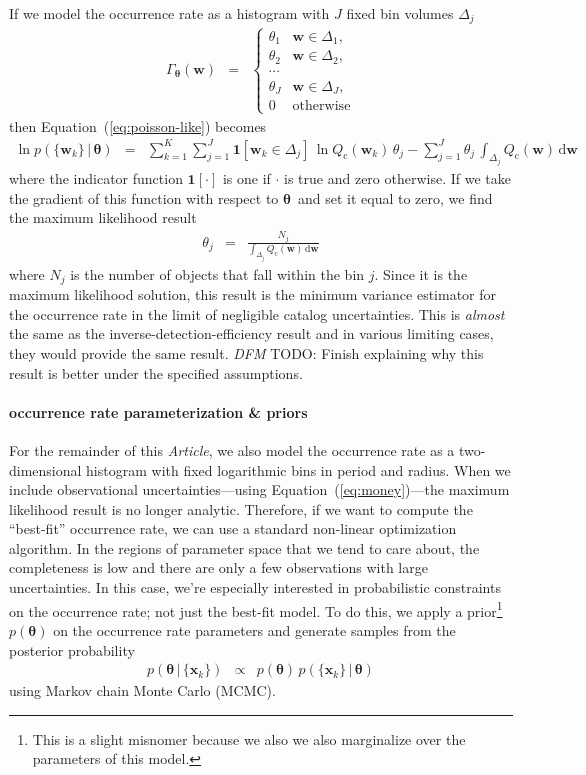 \documentclass[12pt,preprint]{aastex}
\newcommand{\paper}{\textsl{Article}}
\newcommand{\Eq}[1]{Equation~(\ref{eq:#1})}
\newcommand{\eq}[1]{\Eq{#1}}
\newcommand{\eqlabel}[1]{\label{eq:#1}}
\newcommand{\dd}{\ensuremath{\,\mathrm{d}}}
\newcommand{\bvec}[1]{\ensuremath{\boldsymbol{#1}}}
\newcommand{\todo}[3]{{\color{#2} \emph{#1} TODO: #3}}
\newcommand{\dfmtodo}[1]{\todo{DFM}{red}{#1}}
\newcommand{\rate}{\ensuremath{\Gamma}}
\newcommand{\ratepar}{{\ensuremath{\theta}}}
\newcommand{\ratepars}{{\ensuremath{\bvec{\ratepar}}}}
\newcommand{\completeness}{{\ensuremath{Q_\mathrm{c}}}}
\newcommand{\data}{{\ensuremath{\bvec{x}}}}
\newcommand{\entry}{{\ensuremath{\bvec{w}}}}
\newcommand{\binarea}{{\ensuremath{\Delta}}}
\begin{document}
If we model the occurrence rate as a histogram with $J$ fixed bin volumes
$\binarea_j$
\begin{eqnarray}
\rate_\ratepars (\entry) &=& \left\{\begin{array}{ll}
\ratepar_1 & \entry \in \binarea_1,\\
\ratepar_2 & \entry \in \binarea_2,\\
\cdots \\
\ratepar_J & \entry \in \binarea_J,\\
0 & \mathrm{otherwise}
\end{array}\right.
\end{eqnarray}
then \eq{poisson-like} becomes
\begin{eqnarray}
\ln p(\{\entry_k\}\,|\,\ratepars) &=&
    \sum_{k=1}^K \sum_{j=1}^J \mathbf{1}[\entry_k \in
        \binarea_j]\,\ln\completeness(\entry_k)\,\ratepar_j
    -\sum_{j=1}^J\ratepar_j\,\int_{\binarea_j} \completeness(\entry)\dd\entry
\end{eqnarray}
where the indicator function $\mathbf{1}[\cdot]$ is one if $\cdot$ is true and
zero otherwise.
If we take the gradient of this function with respect to \ratepars\ and set it
equal to zero, we find the maximum likelihood result
\begin{eqnarray}
\ratepar_j &=& \frac{N_j}{\int_{\binarea_j} \completeness(\entry)\dd\entry}
\end{eqnarray}
where $N_j$ is the number of objects that fall within the bin $j$.
Since it is the maximum likelihood solution, this result is the minimum
variance estimator for the occurrence rate in the limit of negligible catalog
uncertainties.
This is \emph{almost} the same as the inverse-detection-efficiency result and
in various limiting cases, they would provide the same result.
\dfmtodo{Finish explaining why this result is better under the specified
assumptions.}

\paragraph{occurrence rate parameterization \& priors}
For the remainder of this \paper, we also model the occurrence rate as a
two-dimensional histogram with fixed logarithmic bins in period and radius.
When we include observational uncertainties---using \eq{money}---the maximum
likelihood result is no longer analytic.
Therefore, if we want to compute the ``best-fit'' occurrence rate, we can use a
standard non-linear optimization algorithm.
In the regions of parameter space that we tend to care about, the completeness
is low and there are only a few observations with large uncertainties.
In this case, we're especially interested in probabilistic constraints on the
occurrence rate; not just the best-fit model.
To do this, we apply a prior\footnote{This is a slight misnomer because
we also we also marginalize over the parameters of this model.} $p(\ratepars)$
on the occurrence rate parameters and generate samples from the posterior
probability
\begin{eqnarray}\eqlabel{posterior}
p(\ratepars\,|\,\{\data_k\}) &\propto&
    p(\ratepars)\,p(\{\data_k\}\,|\,\ratepars)
\end{eqnarray}
using Markov chain Monte Carlo (MCMC).
\end{document}
